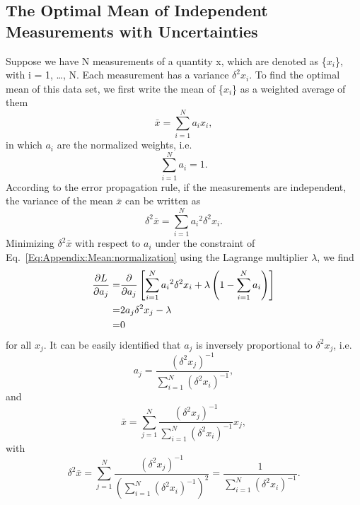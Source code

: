 \begin{appendices}
\chapter{The Optimal Mean of Independent Measurements with Uncertainties\label{chapter:Appendix:Mean}}
Suppose we have N measurements of a quantity x, which are denoted as \{$x_i$\}, with i = 1, \dots, N. Each measurement has a variance $\delta^2 x_i$. To find the optimal mean of this data set, we first write the mean of \{$x_i$\} as a weighted average of them
\begin{equation}
\bar{x}=\sum\limits_{i=1}^N a_i x_i,
\label{Eq:Appendix:Mean:mean}
\end{equation}
in which $a_i$ are the normalized weights, i.e.
\begin{equation}
\sum\limits_{i=1}^Na_i=1.
\label{Eq:Appendix:Mean:normalization}
\end{equation} 
According to the error propagation rule, if the measurements are independent, the variance of the mean $\bar{x}$ can be written as
\begin{equation}
\delta^2\bar{x}=\sum\limits_{i=1}^N{a_i}^2\delta^2x_i.
\label{Eq:Appendix:Mean:variaceofmean}
\end{equation}
Minimizing $\delta^2\bar{x}$ with respect to $a_i$ under the constraint of Eq.~\ref{Eq:Appendix:Mean:normalization} using the Lagrange multiplier $\lambda$, we find
\begin{align}
\frac{\partial L}{\partial a_j}=&\frac{\partial}{\partial a_j}\left[\sum\limits_{i=1}^{N}{a_i}^2\delta^2x_i+\lambda\left(1-\sum\limits_{i=1}^Na_i\right)\right]\notag\\
=&2a_j\delta^2x_j-\lambda\notag\\
=&0
\end{align}
for all {$x_j$}. It can be easily identified that $a_j$ is inversely proportional to $\delta^2x_j$, i.e.
\begin{equation}
a_j=\frac{{\left(\delta^2x_j\right)}^{-1}}{\sum\limits_{i=1}^N {\left(\delta^2x_i\right)}^{-1}},
\label{Eq:Appendix:Mean:aj}
\end{equation}
and
\begin{equation}
\bar{x}=\sum\limits_{j=1}^N \frac{{\left(\delta^2x_j\right)}^{-1}}{\sum\limits_{i=1}^N {\left(\delta^2x_i\right)}^{-1}} x_j,
\label{Eq:Appendix:Mean:meanexpanded}
\end{equation}
with
\begin{equation}
\delta^2\bar{x}=\sum\limits_{j=1}^N \frac{{\left(\delta^2x_j\right)}^{-1}}{\left(\sum\limits_{i=1}^N {\left(\delta^2x_i\right)}^{-1}\right)^2}=\frac{1}{\sum\limits_{i=1}^N {\left(\delta^2x_i\right)}^{-1}}.
\label{Eq:Appendix:Mean:varofmeanexpanded}
\end{equation}


\end{appendices}
